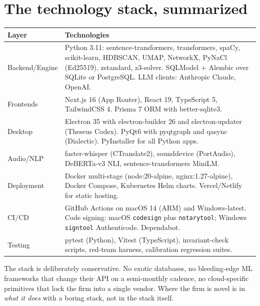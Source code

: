\documentclass[11pt,letterpaper]{article}
\begin{document}
\section{The technology stack, summarized}

\begin{longtable}{p{3cm} p{11.5cm}}
\toprule
\textbf{Layer} & \textbf{Technologies} \\
\midrule
\endhead
Backend/Engine & Python 3.11: sentence-transformers, transformers, spaCy, scikit-learn, HDBSCAN, UMAP, NetworkX, PyNaCl (Ed25519), zstandard, z3-solver. SQLModel + Alembic over SQLite or PostgreSQL. LLM clients: Anthropic Claude, OpenAI. \\
Frontends & Next.js 16 (App Router), React 19, TypeScript 5, TailwindCSS 4. Prisma 7 ORM with better-sqlite3. \\
Desktop & Electron 35 with electron-builder 26 and electron-updater (Theseus Codex). PyQt6 with pyqtgraph and qasync (Dialectic). PyInstaller for all Python apps. \\
Audio/NLP & faster-whisper (CTranslate2), sounddevice (PortAudio), DeBERTa-v3 NLI, sentence-transformers MiniLM. \\
Deployment & Docker multi-stage (node:20-alpine, nginx:1.27-alpine), Docker Compose, Kubernetes Helm charts. Vercel/Netlify for static hosting. \\
CI/CD & GitHub Actions on macOS 14 (ARM) and Windows-latest. Code signing: macOS \texttt{codesign} plus \texttt{notarytool}; Windows \texttt{signtool} Authenticode. Dependabot. \\
Testing & pytest (Python), Vitest (TypeScript), invariant-check scripts, red-team harness, calibration regression suites. \\
\bottomrule
\end{longtable}

The stack is deliberately conservative. No exotic databases, no bleeding-edge ML frameworks that change their API on a semi-monthly cadence, no cloud-specific primitives that lock the firm into a single vendor. Where the firm is novel is in \emph{what it does} with a boring stack, not in the stack itself.
\end{document}
